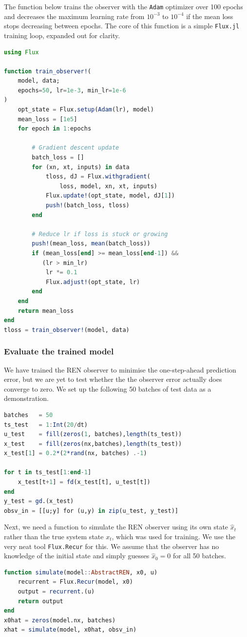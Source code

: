 The function below trains the observer with the \verb|Adam| optimizer over 100 epochs and decreases the maximum learning rate from $10^{-3}$ to $10^{-4}$ if the mean loss stops decreasing between epochs. The core of this function is a simple \verb|Flux.jl| training loop, expanded out for clarity.
\begin{lstlisting}[language = Julia]
using Flux

function train_observer!(
    model, data; 
    epochs=50, lr=1e-3, min_lr=1e-6
)
    opt_state = Flux.setup(Adam(lr), model)
    mean_loss = [1e5]
    for epoch in 1:epochs

        # Gradient descent update
        batch_loss = []
        for (xn, xt, inputs) in data
            tloss, dJ = Flux.withgradient(
                loss, model, xn, xt, inputs)
            Flux.update!(opt_state, model, dJ[1])
            push!(batch_loss, tloss)
        end

        # Reduce lr if loss is stuck or growing
        push!(mean_loss, mean(batch_loss))
        if (mean_loss[end] >= mean_loss[end-1]) && 
           (lr > min_lr)
            lr *= 0.1
            Flux.adjust!(opt_state, lr)
        end
    end
    return mean_loss
end
tloss = train_observer!(model, data)
\end{lstlisting}

\subsubsection{Evaluate the trained model} \label{sec:observer-evaluate}

We have trained the REN observer to minimise the one-step-ahead prediction error, but we are yet to test whether the the observer error actually does converge to zero. We set up the following 50 batches of test data as a demonstration.
\begin{lstlisting}[language = Julia]
batches   = 50
ts_test   = 1:Int(20/dt)
u_test    = fill(zeros(1, batches),length(ts_test))
x_test    = fill(zeros(nx,batches),length(ts_test))
x_test[1] = 0.2*(2*rand(nx, batches) .-1)

for t in ts_test[1:end-1]
    x_test[t+1] = fd(x_test[t], u_test[t])
end
y_test = gd.(x_test)
obsv_in = [[u;y] for (u,y) in zip(u_test, y_test)]
\end{lstlisting}

Next, we need a function to simulate the REN observer using its own state $\hat{x}_t$ rather than the true system state $x_t$, which was used for training. We use the very neat tool \verb|Flux.Recur| for this. We assume that the observer has no knowledge of the initial state and simply guesses $\hat{x}_0 = 0$ for all 50 batches.
\begin{lstlisting}[language = Julia]
function simulate(model::AbstractREN, x0, u)
    recurrent = Flux.Recur(model, x0)
    output = recurrent.(u)
    return output
end
x0hat = zeros(model.nx, batches)
xhat = simulate(model, x0hat, obsv_in)
\end{lstlisting}

